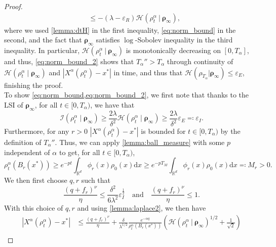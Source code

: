 \documentclass[reqno]{amsart}
\numberwithin{algorithm}{section}
\newcommand{\diff}{\mathrm{d}}
\newcommand{\Xalpha}{{X^\alpha}}
\begin{document}
{\begin{proof}
\begin{align*}
                &\leq -(\lambda - \varepsilon_R) \mathcal H(\rho^\alpha_t\ |\ \boldsymbol\rho_\infty),
    \end{align*}
    where we used \cref{lemma:dtH} in the first inequality, \eqref{eq:norm_bound} in the second, and the fact that $\boldsymbol\rho_\infty$ satisfies $\log$-Sobolev inequality \cite[Sections §22.1–§22.2]{villani2009optimal} in the third inequality. In particular, $\mathcal H(\rho^\alpha_t\ | \ \boldsymbol\rho_\infty)$ is monotonically decreasing on $[0, T_\alpha]$, and thus, \cref{eq:norm_bound_2} shows that $T_\alpha'' > T_\alpha$ through continuity of $\mathcal H(\rho^\alpha_t \mid \boldsymbol\rho_\infty)$ and $| \Xalpha(\rho^\alpha_t) - x^* |$ in time, and thus that $\mathcal H(\rho_{T_\alpha} | \boldsymbol\rho_\infty) \leq \varepsilon_E$, finishing the proof.\\
    To show \cref{eq:norm_bound,eq:norm_bound_2}, we first note that thanks to the LSI of $\boldsymbol\rho_\infty$, for all $t \in [0, T_\alpha)$, we have that
    \begin{equation*}
        \mathcal I(\rho^\alpha_t \mid \boldsymbol\rho_\infty) \geq \frac{2\lambda}{\delta^2} \mathcal H(\rho^\alpha_t \mid \boldsymbol\rho_\infty) \geq \frac{2\lambda}{\delta^2} \varepsilon_E \eqqcolon \varepsilon_I.
    \end{equation*}
    Furthermore, for any $r > 0$  $| \Xalpha(\rho^\alpha_t) - x^* |$ is bounded for $t \in [0, T_\alpha)$ by the definition of $T_\alpha''$. Thus, we can apply \cref{lemma:ball_measure} with some $p$ independent of $\alpha$ to get, for all $t \in [0, T_\alpha)$,
    \begin{equation*}
        \rho^\alpha_t(B_r(x^*)) \geq e^{-p t} \int_{\mathbb{R}^d}\phi_r(x) \rho_0(x) \diff x \geq e^{-p T_M} \int_{\mathbb{R}^d}\phi_r(x) \rho_0(x) \diff x \eqqcolon M_r > 0.
    \end{equation*}
    We then first choose $q, r$ such that
    \begin{equation}\label{eq:choice_q_r}
        \frac{(q+ f_r)^\nu}{\eta} \leq \frac{\delta^2}{6\lambda^2} \varepsilon_I^{\frac{1}{2}} \quad \text{and} \quad \frac{(q+ f_r)^\nu}{\eta} \leq 1.
    \end{equation}
    With this choice of $q, r$ and using \cref{lemma:laplace2}, we then have
    \begin{align*}
        |\Xalpha(\rho^\alpha_t) - x^*| &\leq\frac{(q+ f_r)^\nu}{\eta} + \frac{\delta}{\lambda^{1/2}}\frac{e^{-\alpha q}}{\rho^\alpha_t(B_r(x^*))}\left(\mathcal H(\rho^\alpha_t\ |\ \boldsymbol\rho_\infty)^{1/2} + \frac{1}{\sqrt{2}}\right) \\

\end{align*}
\end{proof}}
\end{document}
